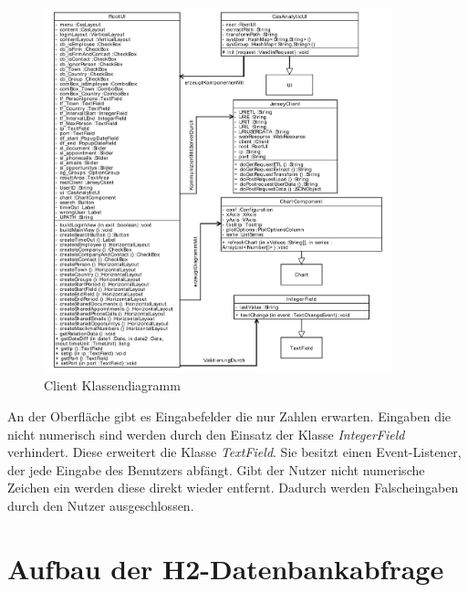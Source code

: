 \begin{figure}[htbp]
\begin{center}
\includegraphics[width=0.9\textwidth]{pics/ClientKlassendiagramm.pdf}
\caption{Client Klassendiagramm}
\label{umsetzung_klassendiagramm_client}
\end{center}
\end{figure}

An der Oberfläche gibt es Eingabefelder die nur Zahlen erwarten. Eingaben die nicht numerisch sind werden durch den Einsatz der Klasse \textit{IntegerField} verhindert. Diese erweitert die Klasse \textit{TextField}. Sie besitzt einen Event-Listener, der jede Eingabe des Benutzers abfängt. Gibt der Nutzer nicht numerische Zeichen ein werden diese direkt wieder entfernt. Dadurch werden Falscheingaben durch den Nutzer ausgeschlossen.

\section{Aufbau der H2-Datenbankabfrage}

